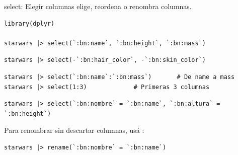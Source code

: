 \documentclass[8pt]{beamer}
\begin{document}
\begin{frame}[fragile]{select: Elegir columnas}
	 elige, reordena o renombra columnas.
\begin{lstlisting}[style=RScript]
library(dplyr)

starwars |> select(`:bn:name`, `:bn:height`, `:bn:mass`)
\end{lstlisting}

\begin{lstlisting}[style=RScript]
starwars |> select(-`:bn:hair_color`, -`:bn:skin_color`)
\end{lstlisting}

\begin{lstlisting}[style=RScript]
starwars |> select(`:bn:name`:`:bn:mass`)       # De name a mass
starwars |> select(1:3)            	# Primeras 3 columnas
\end{lstlisting}

\begin{lstlisting}[style=RScript]
starwars |> select(`:bn:nombre` = `:bn:name`, `:bn:altura` = `:bn:height`)
\end{lstlisting}

	Para renombrar sin descartar columnas, usá :
\begin{lstlisting}[style=RScript]
starwars |> rename(`:bn:nombre` = `:bn:name`)
\end{lstlisting}
\end{frame}
\end{document}
